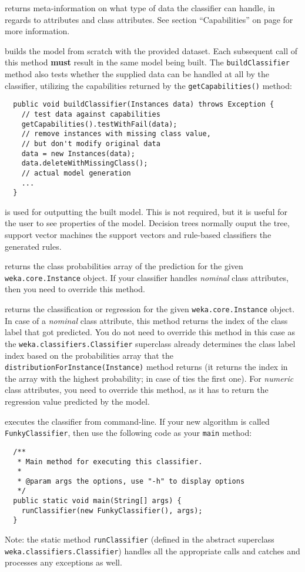 returns meta-information on what type of data the classifier can handle, in
regards to attributes and class attributes. See section ``Capabilities'' on page
\pageref{classifier_capabilities} for more information.

builds the model from scratch with the provided dataset. Each subsequent call of
this method \textbf{must} result in the same model being built. The
\texttt{buildClassifier} method also tests whether the supplied data can be
handled at all by the classifier, utilizing the capabilities returned by the
\texttt{getCapabilities()} method:
\begin{verbatim}
  public void buildClassifier(Instances data) throws Exception {
    // test data against capabilities
    getCapabilities().testWithFail(data);
    // remove instances with missing class value,
    // but don't modify original data
    data = new Instances(data);
    data.deleteWithMissingClass();
    // actual model generation
    ...
  }
\end{verbatim}

is used for outputting the built model. This is not required, but it is useful
for the user to see properties of the model. Decision trees normally ouput the
tree, support vector machines the support vectors and rule-based classifiers the
generated rules.

returns the class probabilities array of the prediction for the given
\texttt{weka.core.Instance} object. If your classifier handles \textit{nominal}
class attributes, then you need to override this method.

returns the classification or regression for the given
\texttt{weka.core.Instance} object. In case of a \textit{nominal} class
attribute, this method returns the index of the class label that got predicted.
You do not need to override this method in this case as the
\texttt{weka.classifiers.Classifier} superclass already determines the class
label index based on the probabilities array that the
\texttt{distributionForInstance(Instance)} method returns (it returns the index
in the array with the highest probability; in case of ties the first one). For
\textit{numeric} class attributes, you need to override this method, as it has
to return the regression value predicted by the model.

executes the classifier from command-line. If your new algorithm is called
\texttt{FunkyClassifier}, then use the following code as your \texttt{main}
method:
\begin{verbatim}
  /**
   * Main method for executing this classifier.
   *
   * @param args the options, use "-h" to display options
   */
  public static void main(String[] args) {
    runClassifier(new FunkyClassifier(), args);
  }
\end{verbatim}
Note: the static method \texttt{runClassifier} (defined in the abstract
superclass \texttt{weka.classifiers.Classifier}) handles all the appropriate
calls and catches and processes any exceptions as well.

